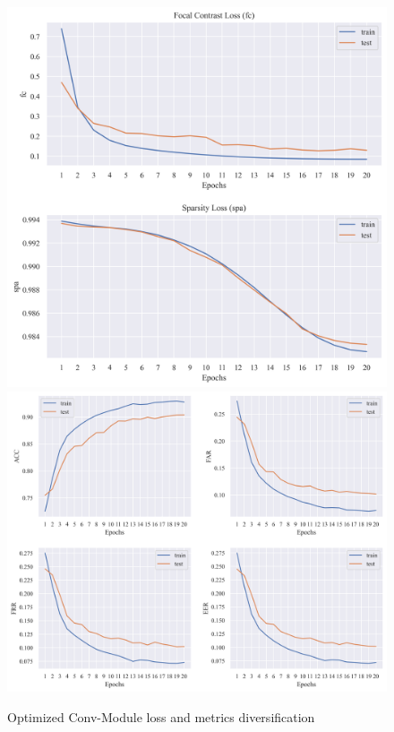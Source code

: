 \begin{figure}[H]
\centering
\includegraphics[scale=0.34]{figure/afloss.png}
\includegraphics[scale=0.33]{figure/afmetrics.png}
\caption{Optimized Conv-Module loss and metrics diversification}
\label{fig:afloss}
\end{figure}

